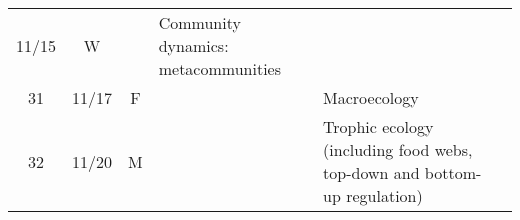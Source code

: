 \documentclass[]{article}
\begin{document}
\begin{longtable}[]{@{}ccclll@{}}
\begin{minipage}[t]{0.08\columnwidth}
11/15\strut
\end{minipage} & \begin{minipage}[t]{0.07\columnwidth}\centering\strut
W\strut
\end{minipage} & \begin{minipage}[t]{0.10\columnwidth}\raggedright\strut
\strut
\end{minipage} & \begin{minipage}[t]{0.12\columnwidth}\raggedright\strut
Community dynamics: metacommunities\strut
\end{minipage} & \begin{minipage}[t]{0.12\columnwidth}\raggedright\strut
\strut
\end{minipage}\tabularnewline
\begin{minipage}[t]{0.13\columnwidth}\centering\strut
31\strut
\end{minipage} & \begin{minipage}[t]{0.08\columnwidth}\centering\strut
11/17\strut
\end{minipage} & \begin{minipage}[t]{0.07\columnwidth}\centering\strut
F\strut
\end{minipage} & \begin{minipage}[t]{0.10\columnwidth}\raggedright\strut
\strut
\end{minipage} & \begin{minipage}[t]{0.12\columnwidth}\raggedright\strut
Macroecology\strut
\end{minipage} & \begin{minipage}[t]{0.12\columnwidth}\raggedright\strut
\strut
\end{minipage}\tabularnewline
\begin{minipage}[t]{0.13\columnwidth}\centering\strut
32\strut
\end{minipage} & \begin{minipage}[t]{0.08\columnwidth}\centering\strut
11/20\strut
\end{minipage} & \begin{minipage}[t]{0.07\columnwidth}\centering\strut
M\strut
\end{minipage} & \begin{minipage}[t]{0.10\columnwidth}\raggedright\strut
\strut
\end{minipage} & \begin{minipage}[t]{0.12\columnwidth}\raggedright\strut
Trophic ecology (including food webs, top-down and bottom-up
regulation)\strut
\end{minipage} & \begin{minipage}[t]{0.12\columnwidth}\raggedright\strut

\end{minipage}
\end{longtable}
\end{document}
